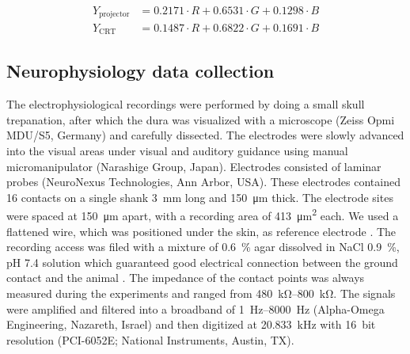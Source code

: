 \begin{align}
    Y_{\text{projector}} &= 0.2171 \cdot R + 0.6531 \cdot G + 0.1298 \cdot B\\
    Y_{\text{CRT}}       &= 0.1487 \cdot R + 0.6822 \cdot G + 0.1691 \cdot B
\end{align}


\subsection{Neurophysiology data collection}

The electrophysiological recordings were performed by doing a small skull trepanation, after which the dura was visualized with a microscope (Zeiss Opmi MDU/S5, Germany) and carefully dissected.
The electrodes were slowly advanced into the visual areas under visual and auditory guidance using manual micromanipulator (Narashige Group, Japan).
Electrodes consisted of laminar probes (NeuroNexus Technologies, Ann Arbor, USA).
These electrodes contained \num{16} contacts on a single shank \SI{3}{\milli\metre} long and \SI{150}{\micro\metre} thick.
The electrode sites were spaced at \SI{150}{\micro\metre} apart, with a recording area of \SI{413}{\micro\metre^2} each.
We used a flattened  wire, which was positioned under the skin, as reference electrode \citep{Murayama2010}.
The recording access was filed with a mixture of \SI{0.6}{\percent} agar dissolved in \ac{NaCl} \SI{0.9}{\percent}, pH 7.4 solution which guaranteed good electrical connection between the ground contact and the animal \citep{Oeltermann2007760}.
The impedance of the contact points was always measured during the experiments and ranged from \SIrange{480}{800}{\kilo\ohm}.
The signals were amplified and filtered into a broadband of \SIrange{1}{8000}{Hz} (Alpha-Omega Engineering, Nazareth, Israel) and then digitized at \SI{20.833}{\kilo\Hz} with \SI{16}{bit} resolution (PCI-6052E; National Instruments, Austin, TX).


